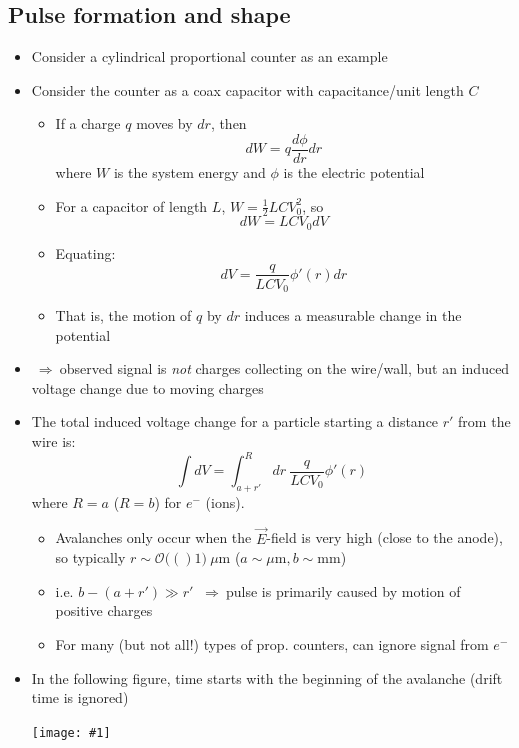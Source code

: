 \documentclass[11pt]{article}
\newcommand{\dd}[2]{\dfrac{d #1}{d #2}}
\newcommand{\E}{\ensuremath{\vec{E}}}
\newcommand{\mum}{\mu\text{m}}
\newcommand{\mm}{\text{mm}}
\newcommand{\el}{\ensuremath{e^{-}}\xspace}
\newcommand{\ord}[1]{\ensuremath{\mathcal{O}(#1)}}
\newcommand{\thus}{$~\Rightarrow~$}
\newcommand{\embedimgw}[2]{\begin{center}\texttt{[image: \#1]}\end{center}}
\begin{document}
\subsection{Pulse formation and shape}
\begin{itemize}
  \item Consider a cylindrical proportional counter as an example
  \item Consider the counter as a coax capacitor with capacitance/unit length $C$
  \begin{itemize}
    \item If a charge $q$ moves by $dr$, then 
    \begin{equation}
      dW = q\dd{\phi}{r} dr
    \end{equation}
    where $W$ is the system energy and $\phi$ is the electric potential
    \item For a capacitor of length $L$, $W = \frac{1}{2}LCV_0^2$, so
    \begin{equation}
      dW = LCV_0 dV
    \end{equation}
    \item Equating:
    \begin{equation}
      dV = \frac{q}{LCV_0}\phi'(r) dr
    \end{equation}
    \item That is, the motion of $q$ by $dr$ induces a measurable change in the potential 
  \end{itemize}
  \item \thus observed signal is \emph{not} charges collecting on the wire/wall, but an induced voltage change due to moving charges
  \item The total induced voltage change for a particle starting a distance $r'$ from the wire is:
  \begin{equation}
    \int dV = \int_{a+r'}^{R} dr~\frac{q}{LCV_0}\phi'(r)
  \end{equation}
  where $R = a$ ($R=b$) for $\el$ (ions). 
  \begin{itemize}
    \item Avalanches only occur when the $\E$-field is very high (close to the anode), so typically $r\sim\ord(1)~\mum$ ($a\sim\mum,b\sim\mm$)
    \item i.e. $b-(a+r')\gg r'$ \thus pulse is primarily caused by motion of positive charges
    \item For many (but not all!) types of prop. counters, can ignore signal from $\el$
  \end{itemize}
  \item In the following figure, time starts with the beginning of the avalanche (drift time is ignored)
  \embedimgw{figs/propcounter_pulseshape.png}{.8}
\end{itemize}
\end{document}
